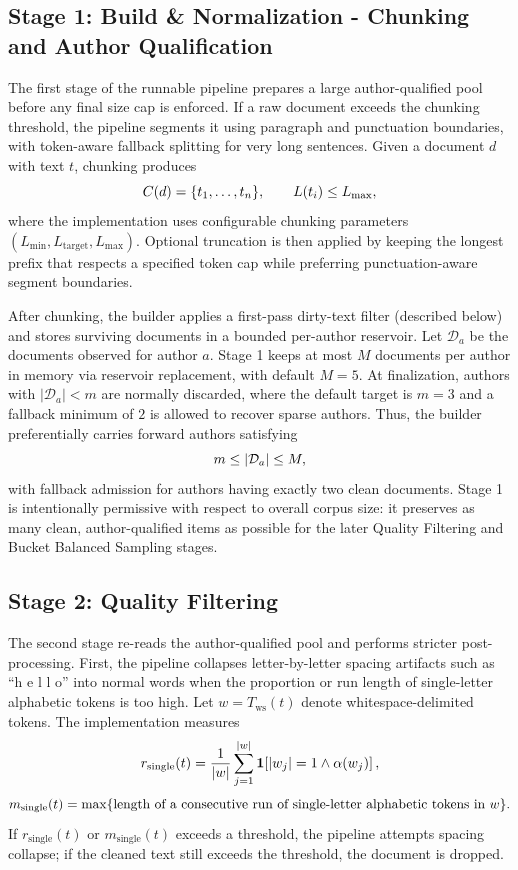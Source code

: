 \documentclass{article}
\newcommand{\ind}[1]{\mathbf{1}\!\left[#1\right]}
\begin{document}
\subsection{Stage 1: Build \& Normalization - Chunking and Author Qualification}
\label{subsec:construct-struct}
{\color{red}The first stage of the runnable pipeline prepares a large author-qualified pool before any final size cap is enforced. If a raw document exceeds the chunking threshold, the pipeline segments it using paragraph and punctuation boundaries, with token-aware fallback splitting for very long sentences. Given a document $d$ with text $t$, chunking produces}
\[
{\color{red}C(d)=\{t_1,\dots,t_n\}, \qquad L(t_i)\le L_{\max},}
\]
{\color{red}where the implementation uses configurable chunking parameters $(L_{\min},L_{\text{target}},L_{\max})$. Optional truncation is then applied by keeping the longest prefix that respects a specified token cap while preferring punctuation-aware segment boundaries.}

{\color{red}After chunking, the builder applies a first-pass dirty-text filter (described below) and stores surviving documents in a bounded per-author reservoir. Let $\mathcal{D}_a$ be the documents observed for author $a$. Stage 1 keeps at most $M$ documents per author in memory via reservoir replacement, with default $M=5$. At finalization, authors with $|\mathcal{D}_a|<m$ are normally discarded, where the default target is $m=3$ and a fallback minimum of $2$ is allowed to recover sparse authors. Thus, the builder preferentially carries forward authors satisfying}
\[
{\color{red}m \le |\mathcal{D}_a| \le M,}
\]
{\color{red}with fallback admission for authors having exactly two clean documents. Stage 1 is intentionally permissive with respect to overall corpus size: it preserves as many clean, author-qualified items as possible for the later Quality Filtering and Bucket Balanced Sampling stages.}

\subsection{Stage 2: Quality Filtering}
\label{subsec:construct-filter}
{\color{red}The second stage re-reads the author-qualified pool and performs stricter post-processing. First, the pipeline collapses letter-by-letter spacing artifacts such as ``h e l l o'' into normal words when the proportion or run length of single-letter alphabetic tokens is too high. Let $w=T_{\text{ws}}(t)$ denote whitespace-delimited tokens. The implementation measures}
\[
{\color{red}
r_{\text{single}}(t)=\frac{1}{|w|}\sum_{j=1}^{|w|}\ind{|w_j|=1 \wedge \alpha(w_j)},
}
\]
\[
{\color{red}
m_{\text{single}}(t)=\max \{\text{length of a consecutive run of single-letter alphabetic tokens in } w\}.
}
\]
{\color{red}If $r_{\text{single}}(t)$ or $m_{\text{single}}(t)$ exceeds a threshold, the pipeline attempts spacing collapse; if the cleaned text still exceeds the threshold, the document is dropped.}
\end{document}
